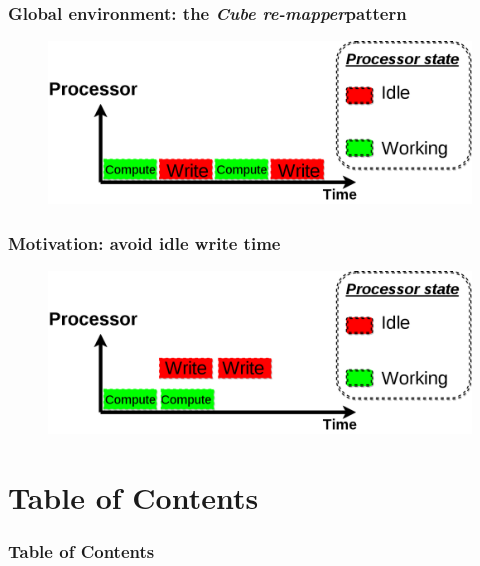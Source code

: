 \documentclass[slidestop,xcolor=dvipsnames, notes=hide]{beamer}
\newcommand{\toolTargetSoftware}			{\emph{Cube re-mapper}}
\begin{document}
	\begin{frame}
		\frametitle{Global environment: the \toolTargetSoftware\space pattern}
		\begin{figure}
			\center
			\includegraphics[width=1\textwidth, height=0.6\textheight]{images/internship_juelich_cubeRemapper_pattern.png}
		\end{figure}
	\end{frame}


	\begin{frame}
		\frametitle{Motivation: avoid idle write time}
		\center
		\begin{figure}
			\center
			\includegraphics[width=1\textwidth, height=0.6\textheight]{images/internship_juelich_cubeRemapper_pattern_ideal.png}
		\end{figure}
	\end{frame}



\section*{Table of Contents}
\begin{frame}[fragile]
	\frametitle{Table of Contents}
	\tableofcontents
\end{frame}
\end{document}
